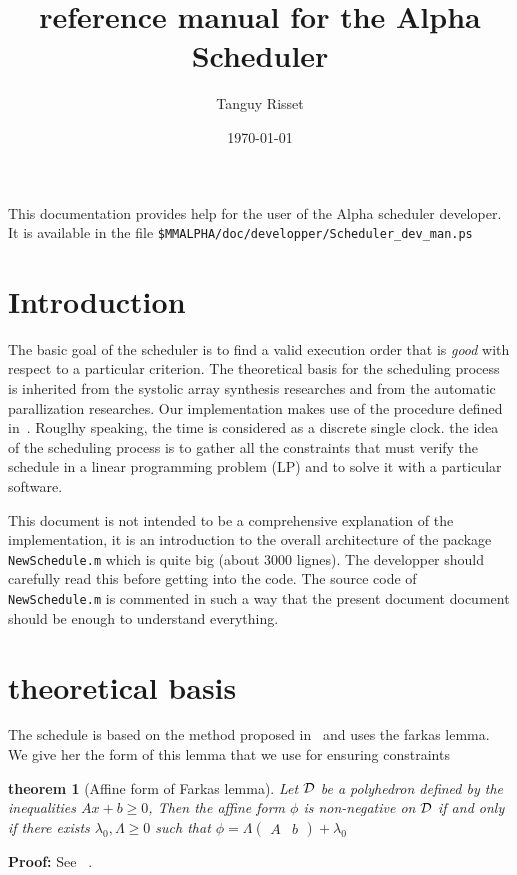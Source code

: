 
\newcommand{\aalpha}{{\sc Alpha}}
\newcommand{\ammalpha}{{\sc MmAlpha}}
\newcommand{\err}{\top}
\newcommand{\indef}{\bot}
\newtheorem{theorem}{theorem} 

\title{reference manual for the Alpha {\bf Scheduler}}
\author{Tanguy Risset}
\date{\today}


%

\maketitle

This documentation provides help for the user of the {\aalpha} 
scheduler developer. It is available in the file 
{\tt \$MMALPHA/doc/developper/Scheduler\_dev\_man.ps}

\section{Introduction}

 The basic goal of the scheduler 
is to find a valid execution order that is {\em good} with respect to 
a particular criterion. The theoretical basis for the scheduling process 
is inherited from the systolic array synthesis researches and from the 
automatic parallization researches. Our  implementation makes use of the 
procedure defined in~\cite{Feautrier92aa}. Rouglhy speaking, 
the time is considered as a discrete  
single clock. the idea of the scheduling process is to 
gather all the constraints that must verify the schedule in a 
 linear programming problem (LP) and to solve it with a particular 
software.

This document is not intended to be a comprehensive explanation of the
implementation, it is an introduction to the overall architecture of
the package {\tt NewSchedule.m} which is quite big (about 3000 lignes).
The developper should carefully read this before getting into the
code.  The source code of {\tt NewSchedule.m} is commented in such a way
that the present document document should be enough to understand
everything.  


\section{theoretical basis}
\label{theoric}
The schedule is based on the method proposed in~\cite{Feautrier92aa}
and uses the farkas lemma. We give her the
form of this lemma that we use for ensuring constraints
\begin{theorem}[Affine form of Farkas lemma]
\label{affineFeautrier}
Let ${\cal D}$ be a polyhedron defined by the inequalities $Ax + b \geq 0 $,
Then the affine form $\phi$ is non-negative on ${\cal D}$ if and only
if there exists $\lambda_0,\Lambda \geq 0$ such that $\phi=\Lambda
\left(\begin{array}{cc} A & b \end{array}\right) +\lambda_0$
\end{theorem}
{\bf Proof:} See~\cite{Schrijver86} .

